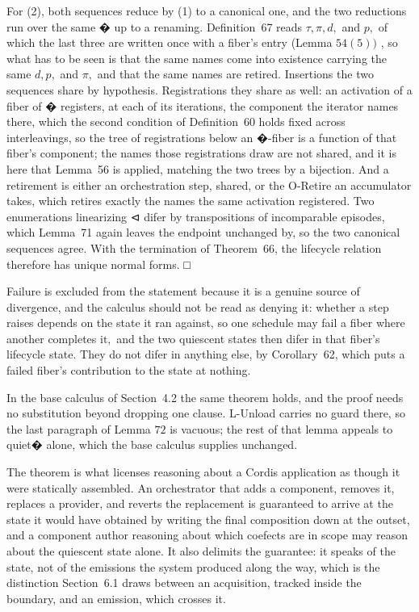 \documentclass[
  10
]{article}
\begin{document}
For (2), both sequences reduce by (1) to a canonical one, and the two
reductions run over the same � up to a renaming. Definition~67 reads
\(\tau , \pi , d ,\) and \(p ,\) of which the last three are written
once with a fiber's entry (Lemma \(5 4 ( 5 ) )\) , so what has to be
seen is that the same names come into existence carrying the same
\(d , p ,\) and \(\pi ,\) and that the same names are retired.
Insertions the two sequences share by hypothesis. Registrations they
share as well: an activation of a fiber of � registers, at each of its
iterations, the component the iterator names there, which the second
condition of Definition~60 holds fixed across interleavings, so the tree
of registrations below an �-fiber is a function of that fiber's
component; the names those registrations draw are not shared, and it is
here that Lemma~56 is applied, matching the two trees by a bijection.
And a retirement is either an orchestration step, shared, or the
O-Retire an accumulator takes, which retires exactly the names the same
activation registered. Two enumerations linearizing ⊲ difer by
transpositions of incomparable episodes, which Lemma~71 again leaves the
endpoint unchanged by, so the two canonical sequences agree. With the
termination of Theorem~66, the lifecycle relation therefore has unique
normal forms. □

Failure is excluded from the statement because it is a genuine source of
divergence, and the calculus should not be read as denying it: whether a
step raises depends on the state it ran against, so one schedule may
fail a fiber where another completes \({ \mathrm { i t } } ,\) and the
two quiescent states then difer in that fiber's lifecycle state. They do
not difer in anything else, by Corollary~62, which puts a failed fiber's
contribution to the state at nothing.

In the base calculus of Section~4.2 the same theorem holds, and the
proof needs no substitution beyond dropping one clause. L-Unload carries
no guard there, so the last paragraph of Lemma \(7 2\) is vacuous; the
rest of that lemma appeals to quiet� alone, which the base calculus
supplies unchanged.

The theorem is what licenses reasoning about a Cordis application as
though it were statically assembled. An orchestrator that adds a
component, removes it, replaces a provider, and reverts the replacement
is guaranteed to arrive at the state it would have obtained by writing
the final composition down at the outset, and a component author
reasoning about which coefects are in scope may reason about the
quiescent state alone. It also delimits the guarantee: it speaks of the
state, not of the emissions the system produced along the way, which is
the distinction Section~6.1 draws between an acquisition, tracked inside
the boundary, and an emission, which crosses it.
\end{document}
